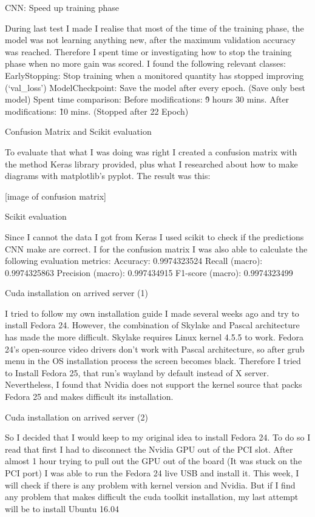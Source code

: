 CNN: Speed up training phase

During last test I made I realise that most of the time of the training phase, the model was not learning anything new, after the maximum validation accuracy was reached. Therefore I spent time or investigating how to stop the training phase when no more gain was scored. I found the following relevant classes:
EarlyStopping: Stop training when a monitored quantity has stopped improving (‘val\_loss’)
ModelCheckpoint: Save the model after every epoch. (Save only best model)
Spent time comparison:
Before modifications: \~9 hours 30 mins.
After modifications: \~10 mins. (Stopped after 22 Epoch)

Confusion Matrix and Scikit evaluation

To evaluate that what I was doing was right I created a confusion matrix with the method Keras library provided, plus what I researched about how to make diagrams with matplotlib’s pyplot. The result was this:

[image of confusion matrix]

Scikit evaluation\cite{scikit-learn}

Since I cannot the data I got from Keras I used scikit to check if the predictions CNN make are correct. I for the confusion matrix I was also able to calculate the following evaluation metrics:
Accuracy: 0.9974323524
Recall (macro): 0.9974325863
Precision (macro): 0.997434915
F1-score (macro): 0.9974323499

Cuda installation on arrived server (1)

I tried to follow my own installation guide I made several weeks ago and try to install Fedora 24. However, the combination of Skylake and Pascal architecture has made the more difficult.
Skylake requires Linux kernel 4.5.5 to work.
Fedora 24’s open-source video drivers don’t work with Pascal architecture, so after grub menu in the OS installation process the screen becomes black.
Therefore I tried to Install Fedora 25, that run’s wayland by default instead of X server. Nevertheless, I found that Nvidia does not support the kernel source that packs Fedora 25 and makes difficult its installation.

Cuda installation on arrived server (2)

So I decided that I would keep to my original idea to install Fedora 24. To do so I read that first I had to disconnect the Nvidia GPU out of the PCI slot. After almost 1 hour trying to pull out the GPU out of the board (It was stuck on the PCI port) I was able to run the Fedora 24 live USB and install it.
This week, I will check if there is any problem with kernel version and Nvidia. But if I find any problem that makes difficult the cuda toolkit installation, my last attempt will be to install Ubuntu 16.04

